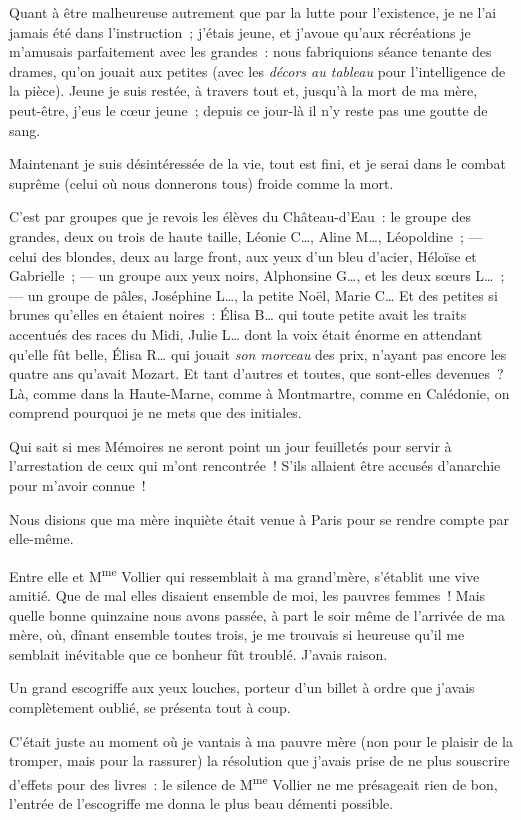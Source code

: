 \documentclass[french,twoside]{book} %
\begin{document}
Quant à être malheureuse autrement que par la lutte pour l’existence, je ne l’ai jamais été dans  l’instruction ; j’étais jeune, et j’avoue qu’aux récréations je m’amusais parfaitement avec les grandes : nous fabriquions séance tenante des drames, qu’on jouait aux petites (avec les \emph{décors au tableau} pour l’intelligence de la pièce). Jeune je suis restée, à travers tout et, jusqu’à la mort de ma mère, peut-être, j’eus le cœur jeune ; depuis ce jour-là il n’y reste pas une goutte de sang.\par
Maintenant je suis désintéressée de la vie, tout est fini, et je serai dans le combat suprême (celui où nous donnerons tous) froide comme la mort.\par
C’est par groupes que je revois les élèves du Château-d’Eau : le groupe des grandes, deux ou trois de haute taille, Léonie C…, Aline M…, Léopoldine ; — celui des blondes, deux au large front, aux yeux d’un bleu d’acier, Héloïse et Gabrielle ; — un groupe aux yeux noirs, Alphonsine G…, et les deux sœurs L… ; — un groupe de pâles, Joséphine L…, la petite Noël, Marie C… Et des petites si brunes qu’elles en étaient noires : Élisa B… qui toute petite avait les traits accentués des races du Midi, Julie L… dont la voix était énorme en attendant qu’elle fût belle, Élisa R… qui jouait \emph{son morceau} des prix, n’ayant pas encore les quatre ans qu’avait Mozart. Et tant d’autres et toutes, que sont-elles devenues ? Là, comme  dans la Haute-Marne, comme à Montmartre, comme en Calédonie, on comprend pourquoi je ne mets que des initiales.\par
Qui sait si mes Mémoires ne seront point un jour feuilletés pour servir à l’arrestation de ceux qui m’ont rencontrée ! S’ils allaient être accusés d’anarchie pour m’avoir connue !\par
Nous disions que ma mère inquiète était venue à Paris pour se rendre compte par elle-même.\par
Entre elle et M\textsuperscript{me} Vollier qui ressemblait à ma grand’mère, s’établit une vive amitié. Que de mal elles disaient ensemble de moi, les pauvres femmes ! Mais quelle bonne quinzaine nous avons passée, à part le soir même de l’arrivée de ma mère, où, dînant ensemble toutes trois, je me trouvais si heureuse qu’il me semblait inévitable que ce bonheur fût troublé. J’avais raison.\par
Un grand escogriffe aux yeux louches, porteur d’un billet à ordre que j’avais complètement oublié, se présenta tout à coup.\par
C’était juste au moment où je vantais à ma pauvre mère (non pour le plaisir de la tromper, mais pour la rassurer) la résolution que j’avais prise de ne plus souscrire d’effets pour des livres : le silence de M\textsuperscript{me} Vollier ne me présageait rien de bon, l’entrée de l’escogriffe me donna le plus beau démenti possible.\par
\end{document}
